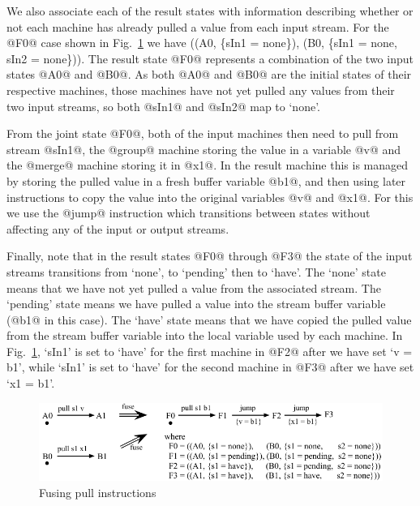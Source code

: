 We also associate each of the result states with information describing whether or not each machine has already pulled a value from each input stream. For the @F0@ case shown in Fig.~\ref{fig:Fusion:Pulls} we have ((A0, \{sIn1 = none\}), (B0, \{sIn1 = none, sIn2 = none\})). The result state @F0@ represents a combination of the two input states @A0@ and @B0@. As both @A0@ and @B0@ are the initial states of their respective machines, those machines have not yet pulled any values from their two input streams, so both @sIn1@ and @sIn2@ map to `none'.

From the joint state @F0@, both of the input machines then need to pull from stream @sIn1@, the @group@ machine storing the value in a variable @v@ and the @merge@ machine storing it in @x1@. In the result machine this is managed by storing the pulled value in a fresh buffer variable @b1@, and then using later instructions to copy the value into the original variables @v@ and @x1@. For this we use the @jump@ instruction which transitions between states without affecting any of the input or output streams.


Finally, note that in the result states @F0@ through @F3@ the state of the input streams transitions from `none', to `pending' then to `have'. The `none' state means that we have not yet pulled a value from the associated stream. The `pending' state means we have pulled a value into the stream buffer variable (@b1@ in this case). The `have' state means that we have copied the pulled value from the stream buffer variable into the local variable used by each machine. In Fig.~\ref{fig:Fusion:Pulls},  `sIn1' is set to `have' for the first machine in @F2@ after we have set `v = b1', while `sIn1' is set to `have' for the second machine in @F3@ after we have set `x1 = b1'. 


\begin{figure}
\includegraphics[scale=1.1]{figures/fuse-pull-pull.pdf}
\caption{Fusing pull instructions}
\label{fig:Fusion:Pulls}
\end{figure}


